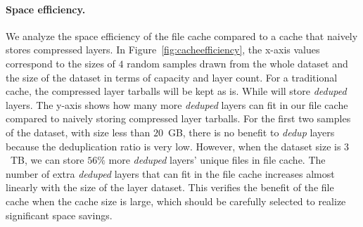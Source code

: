\vspace{-6pt}
\paragraph{Space efficiency.}
We analyze the space efficiency of the file cache compared to a cache that naively stores
compressed layers.
%
%
In Figure~\ref{fig:cacheefficiency}, the x-axis values correspond to the sizes of $4$ random samples drawn from the whole dataset and the size of the dataset in terms of capacity and layer count.
For a traditional cache, the compressed layer tarballs will be kept as is.
While \sysname will store \emph{deduped} layers. 
The y-axis shows how many more \emph{deduped} layers can fit in our file cache compared to naively storing compressed layer tarballs.
For the first two samples of the dataset, with size less than $20$~GB, 
there is no benefit to \emph{dedup} layers 
because the deduplication ratio is very low.
However, when the dataset size is $3$~TB, we can store $56\%$ more \emph{deduped} layers' unique files in file cache.
The number of extra \emph{deduped} layers that can fit in the file cache increases almost linearly with the size of the layer dataset.
This verifies the benefit of the file cache when the cache size is large, which should be carefully selected to realize significant space savings.





